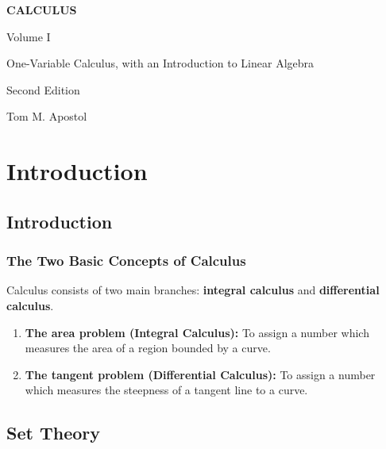 \documentclass[12pt,a4paper]{book}
\begin{document}
\begin{titlepage}
    \centering
    \vspace*{3cm}
    {\Huge\bfseries CALCULUS\par}
    \vspace{1cm}
    {\Large Volume I\par}
    \vspace{0.5cm}
    {\large One-Variable Calculus, with an Introduction to Linear Algebra\par}
    \vspace{2cm}
    {\Large Second Edition\par}
    \vspace{3cm}
    {\large Tom M. Apostol\par}
    \vfill
\end{titlepage}

\tableofcontents
\newpage

\part{Introduction}

\chapter{Introduction}

\section{The Two Basic Concepts of Calculus}

Calculus consists of two main branches: \textbf{integral calculus} and \textbf{differential calculus}.

\begin{enumerate}
    \item \textbf{The area problem (Integral Calculus):} To assign a number which measures the area of a region bounded by a curve.
    \item \textbf{The tangent problem (Differential Calculus):} To assign a number which measures the steepness of a tangent line to a curve.
\end{enumerate}

\chapter{Set Theory}
\end{document}
